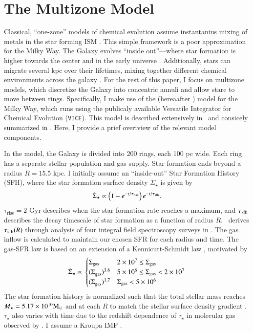 \documentclass[12pt,oneside]{report}
\newcommand{\JJ}{\citetalias{james+21}}
\newcommand{\VICE}{\texttt{VICE}}
\begin{document}
\chapter{The Multizone Model}\label{sec:vice}

Classical, ``one-zone'' models of chemical evolution assume instantanius mixing of metals in the star forming ISM \citep[e.g.][]{matteucci21}. This simple framework is a poor approximation for the Milky Way.  The Galaxy evolves ``inside out''---where star formation is higher towards the center and in the early universe \citep{bird+13}. Additionally, stars can migrate several kpc over their lifetimes, mixing together different chemical environments across the galaxy \citep{bird+12,sellwood+binney02}. For the rest of this paper, I focus on multizone models, which discretize the Galaxy into concentric annuli and allow stare to move between rings.  Specifically, I make use of the \citet{james+21} (hereaafter \JJ) model for the Milky Way, which runs using the publicaly available Versatile Integrator for Chemical Evolution (\VICE). This model is described extensively in \JJ~and consicely summarized  in \citet{james+22}. Here, I provide a prief overiview of the relevant model components.

In the model, the Galaxy is divided into 200 rings, each 100 pc wide. Each ring has a seperate stellar population and gas supply. Star formation ends beyond a radius $R=15.5$ kpc. I initially assume an ``inside-out'' Star Formation History (SFH), where the star formation surface density $\Sigma_\star$ is given by 
\begin{equation}
    \dot{\Sigma}_\star \propto \left(1-e^{-t/\tau_{\rm rise}}\right) e^{-t/\tau_{\rm sfh}}.
\end{equation}
$\tau_\text{rise}=2$ Gyr describes when the star formation rate reaches a maximum, and $\tau_{\rm sfh}$ describes the decay timescale of star formation as a function of radius $R$. \JJ~derives $\tau_{\rm sfh}(R)$ through analysis of four integral field spectroscopy surveys in \cite{sanches20}.
The gas inflow is calculated to maintain our chosen SFR for each radius and time. The gas-SFR law is based on an extension of a Kennicutt-Schmidt law \citep{kennicutt98}, motivated by 
\begin{equation}
\dot{\Sigma}_{\star} \propto \\
\begin{cases}
    {\Sigma}_{\rm gas} & 2\times 10^7 \leq \Sigma_{\rm gas} \\ 
    {(\Sigma}_{\rm gas})^{3.6} & 5\times 10^6 \leq \Sigma_{\rm gas} < 2\times10^7 \\ 
    {(\Sigma}_{\rm gas})^{1.7} & \Sigma_{\rm gas} < 5\times10^6 \\ 
\end{cases}
\end{equation}
The star formation history is normalized such that the total stellar mass reaches $M_\star=5.17\times10^{10} {\rm M}_\odot$ \citep{LM15} and at each $R$ to match the stellar surface density gradient \citep{BHG16}.
$\tau_\star$ also varies with time due to the redshift dependence of $\tau_\star$ in molecular gas observed by \citet{tacconi18}.
I assume a Kroupa IMF \cite{kroupa01}.
\end{document}
